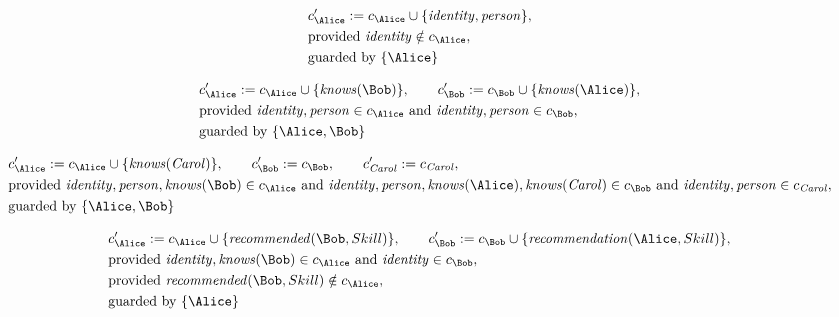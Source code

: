 \begin{align*}
&
c'_
{
\Alice
}
 := 
c_
{
\Alice
}
 \cup 
\{
\mathit{\detokenize{
identity
}}
,
\mathit{\detokenize{
person
}}
\}
,\\
&
\text{provided } 
\mathit{\detokenize{
identity
}}
 \notin c_
{
\Alice
}
,\\
&
\text{guarded by } \{
\Alice
\}
\end{align*}

\begin{align*}
&
c'_
{
\Alice
}
 := 
c_
{
\Alice
}
 \cup 
\{
\mathit{\detokenize{
knows
}}
(
\Bob
)
\}
, \qquad 
c'_
{
\Bob
}
 := 
c_
{
\Bob
}
 \cup 
\{
\mathit{\detokenize{
knows
}}
(
\Alice
)
\}
,\\
&
\text{provided } 
\mathit{\detokenize{
identity
}}
,
\mathit{\detokenize{
person
}}
 \in c_
{
\Alice
}
 \text{ and } 
\mathit{\detokenize{
identity
}}
,
\mathit{\detokenize{
person
}}
 \in c_
{
\Bob
}
,\\
&
\text{guarded by } \{
\Alice
,
\Bob
\}
\end{align*}

\begin{align*}
&
c'_
{
\Alice
}
 := 
c_
{
\Alice
}
 \cup 
\{
\mathit{\detokenize{
knows
}}
(
\mathit{Carol}
)
\}
, \qquad 
c'_
{
\Bob
}
 := 
c_
{
\Bob
}
, \qquad 
c'_
{
\mathit{Carol}
}
 := 
c_
{
\mathit{Carol}
}
,\\
&
\text{provided } 
\mathit{\detokenize{
identity
}}
,
\mathit{\detokenize{
person
}}
,
\mathit{\detokenize{
knows
}}
(
\Bob
)
 \in c_
{
\Alice
}
 \text{ and } 
\mathit{\detokenize{
identity
}}
,
\mathit{\detokenize{
person
}}
,
\mathit{\detokenize{
knows
}}
(
\Alice
)
,
\mathit{\detokenize{
knows
}}
(
\mathit{Carol}
)
 \in c_
{
\Bob
}
 \text{ and } 
\mathit{\detokenize{
identity
}}
,
\mathit{\detokenize{
person
}}
 \in c_
{
\mathit{Carol}
}
,\\
&
\text{guarded by } \{
\Alice
,
\Bob
\}
\end{align*}

\begin{align*}
&
c'_
{
\Alice
}
 := 
c_
{
\Alice
}
 \cup 
\{
\mathit{\detokenize{
recommended
}}
(
\Bob
,
Skill
)
\}
, \qquad 
c'_
{
\Bob
}
 := 
c_
{
\Bob
}
 \cup 
\{
\mathit{\detokenize{
recommendation
}}
(
\Alice
,
Skill
)
\}
,\\
&
\text{provided } 
\mathit{\detokenize{
identity
}}
,
\mathit{\detokenize{
knows
}}
(
\Bob
)
 \in c_
{
\Alice
}
 \text{ and } 
\mathit{\detokenize{
identity
}}
 \in c_
{
\Bob
}
,\\
&
\text{provided } 
\mathit{\detokenize{
recommended
}}
(
\Bob
,
Skill
)
 \notin c_
{
\Alice
}
,\\
&
\text{guarded by } \{
\Alice
\}
\end{align*}
